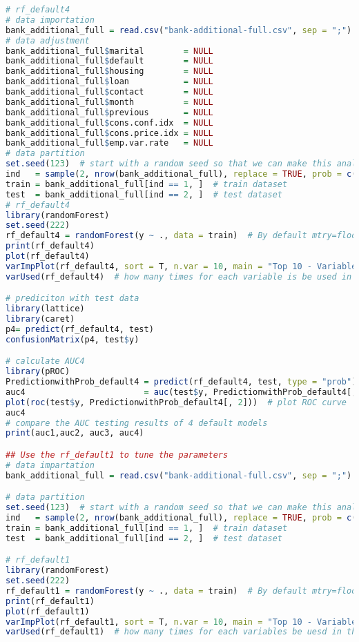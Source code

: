 \documentclass[12pt, a4paper, bibliography=totoc, english]{scrartcl}
\begin{document}
\begin{lstlisting}[language = R]
# rf_default4
# data importation
bank_additional_full = read.csv("bank-additional-full.csv", sep = ";")
# data adjustment
bank_additional_full$marital        = NULL
bank_additional_full$default        = NULL
bank_additional_full$housing        = NULL
bank_additional_full$loan           = NULL
bank_additional_full$contact        = NULL
bank_additional_full$month          = NULL
bank_additional_full$previous       = NULL
bank_additional_full$cons.conf.idx  = NULL
bank_additional_full$cons.price.idx = NULL
bank_additional_full$emp.var.rate   = NULL
# data partition
set.seed(123)  # start with a random seed so that we can make this analysis repeatable 
ind   = sample(2, nrow(bank_additional_full), replace = TRUE, prob = c(0.8, 0.2))  # divide the dataset into two parts
train = bank_additional_full[ind == 1, ]  # train dataset
test  = bank_additional_full[ind == 2, ]  # test dataset
# rf_default4
library(randomForest)
set.seed(222)
rf_default4 = randomForest(y ~ ., data = train)  # By default mtry=floor(sqrt(ncol(x)))  ntree = 500
print(rf_default4)
plot(rf_default4)
varImpPlot(rf_default4, sort = T, n.var = 10, main = "Top 10 - Variable Importance")  # showing the importance of the variables in plot
varUsed(rf_default4)  # how many times for each variable is be used in the tuned random forest model

# prediciton with test data
library(lattice)
library(caret)
p4= predict(rf_default4, test)
confusionMatrix(p4, test$y)

# calculate AUC4
library(pROC)
PredictionwithProb_default4 = predict(rf_default4, test, type = "prob")
auc4                        = auc(test$y, PredictionwithProb_default4[, 2])
plot(roc(test$y, PredictionwithProb_default4[, 2]))  # plot ROC curve
auc4
# compare the AUC testing results of 4 default models
print(auc1,auc2, auc3, auc4)

## Use the rf_default1 to tune the parameters
# data impartation
bank_additional_full = read.csv("bank-additional-full.csv", sep = ";")

# data partition
set.seed(123)  # start with a random seed so that we can make this analysis repeatable 
ind   = sample(2, nrow(bank_additional_full), replace = TRUE, prob = c(0.8, 0.2))  # divide the dataset into two parts
train = bank_additional_full[ind == 1, ]  # train dataset
test  = bank_additional_full[ind == 2, ]  # test dataset

# rf_default1
library(randomForest)
set.seed(222)
rf_default1 = randomForest(y ~ ., data = train)  # By default mtry=floor(sqrt(ncol(x)))  ntree = 500
print(rf_default1)
plot(rf_default1)
varImpPlot(rf_default1, sort = T, n.var = 10, main = "Top 10 - Variable Importance")  # showing the importance of the variables in plot
varUsed(rf_default1)  # how many times for each variables be uesd in the tuned random forest model



\end{lstlisting}
\end{document}
